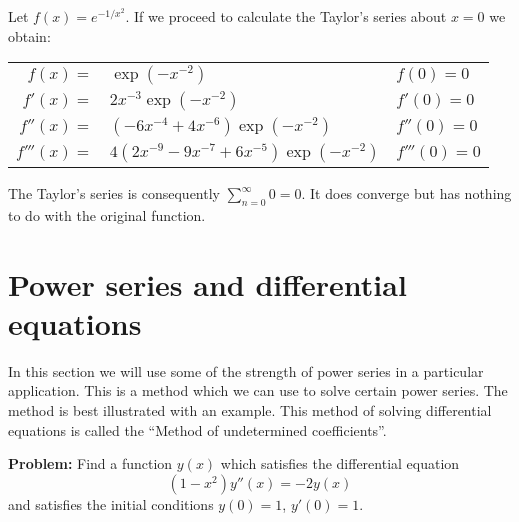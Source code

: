 \begin{example*}
  Let  \(f(x) = e^{-1/x^2}\).
  If we proceed to calculate the Taylor's series about \(x=0\) we obtain:

  \begin{tabular}{ r l  l}
    \(f(x) = \)  & \( \exp(-x^{-2})\)
                 &
    \(f(0)=0\)
    \\
    \(f'(x)=\)   & \( 2x^{-3} \exp(-x^{-2})\)
                 &
    \(f'(0)=0\)
    \\
    \(f''(x)=\)  & \( (-6 x^{-4}   + 4x^{-6} )\exp(-x^{-2})  \)
                 &
    \(f''(0)=0\)
    \\
    \(f'''(x)=\) & \( 4 (2x^{-9} - 9 x^{-7} + 6 x^{-5})\exp(-x^{-2})\)
                 &
    \(f'''(0)=0\)
  \end{tabular}

  \noindent
  The Taylor's series is consequently \(\sum_{n=0}^{\infty} 0 = 0\).
  It does converge but has nothing to do with the original function.
\end{example*}









\section{Power series and differential equations}

In this section we will use some of the strength of power series in a particular application. This is a method which we can use to solve certain power series. The method is best illustrated with an example.
This method of solving differential equations is called the ``Method of undetermined coefficients''.

\noindent
\textbf{Problem:}
Find a function \(y(x)\) which satisfies the differential equation
\[
  (1-x^2)y''(x) = -2y(x)
\]
and satisfies the initial conditions \(y(0)=1\), \(y'(0)=1\).

